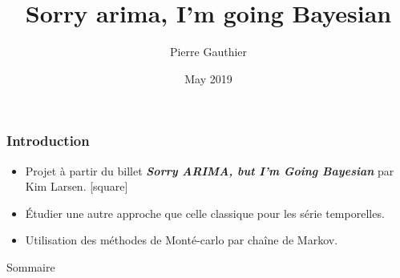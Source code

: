 \documentclass{presentation_template}
\author{Pierre Gauthier}
\title[Sorry ARIMA]{Sorry arima, I'm going Bayesian}
\institute[]{{\'Ecole des Mines de Nancy}}
\date{May 2019}
\begin{document}
{

}





 \begin{frame}
   \frametitle{Introduction}
   \begin{itemize}
      \item Projet à partir du billet \textbf{\textit{Sorry ARIMA, but I’m Going Bayesian}} par Kim Larsen.
        \vspace{0.2cm}
        [square]
        \item \'Etudier une autre approche que celle classique pour les série temporelles.
        \vspace{0.2cm}
      \item Utilisation des méthodes de Monté-carlo par chaîne de Markov.
   \end{itemize}
 
   
 
 \end{frame}
\begin{frame}{Sommaire}
\tableofcontents
\end{frame}

\end{document}
